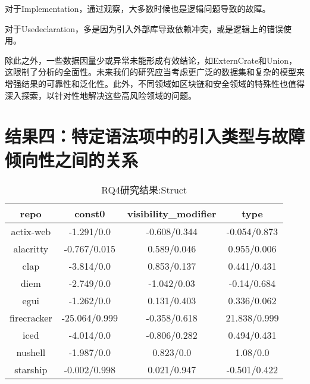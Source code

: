 对于Implementation，通过观察，大多数时候也是逻辑问题导致的故障。

对于Usedeclaration，多是因为引入外部库导致依赖冲突，或是逻辑上的错误使用。

除此之外，一些数据因量少或异常未能形成有效结论，如ExternCrate和Union，这限制了分析的全面性。未来我们的研究应当考虑更广泛的数据集和复杂的模型来增强结果的可靠性和泛化性。此外，不同领域如区块链和安全领域的特殊性也值得深入探索，以针对性地解决这些高风险领域的问题。

\section{结果四：特定语法项中的引入类型与故障倾向性之间的关系}

\begin{table}[ht]
	\centering
        \caption{RQ4研究结果:Struct}
	\begin{tabular}{cccc}
        \toprule
		\textbf{repo}        & \textbf{const0}        & \textbf{visibility\_modifier} & \textbf{type}         \\
        \midrule
		actix-web   & \cellcolor{orange!30}-1.291/0.0    & \cellcolor{gray!20}-0.608/0.344        & \cellcolor{gray!20}-0.054/0.873 \\
		alacritty   & \cellcolor{orange!30}-0.767/0.015  & \cellcolor{green!20}0.589/0.046         & \cellcolor{green!20}0.955/0.006  \\
		clap        & \cellcolor{orange!30}-3.814/0.0    & \cellcolor{gray!20}0.853/0.137         & \cellcolor{gray!20}0.441/0.431  \\
		diem        & \cellcolor{orange!30}-2.749/0.0    & \cellcolor{orange!30}-1.042/0.03         & \cellcolor{gray!20}-0.14/0.684  \\
		egui        & \cellcolor{orange!30}-1.262/0.0    & \cellcolor{gray!20}0.131/0.403         & \cellcolor{gray!20}0.336/0.062  \\
		firecracker & \cellcolor{gray!20}-25.064/0.999 & \cellcolor{gray!20}-0.358/0.618        & \cellcolor{gray!20}21.838/0.999 \\
		iced        & \cellcolor{orange!30}-4.014/0.0    & \cellcolor{gray!20}-0.806/0.282        & \cellcolor{gray!20}0.494/0.431  \\
		nushell     & \cellcolor{orange!30}-1.987/0.0    & \cellcolor{green!20}0.823/0.0           & \cellcolor{green!20}1.08/0.0     \\
		starship    & \cellcolor{gray!20}-0.002/0.998  & \cellcolor{gray!20}0.021/0.947         & \cellcolor{gray!20}-0.501/0.422 \\

\end{tabular}
\end{table}
